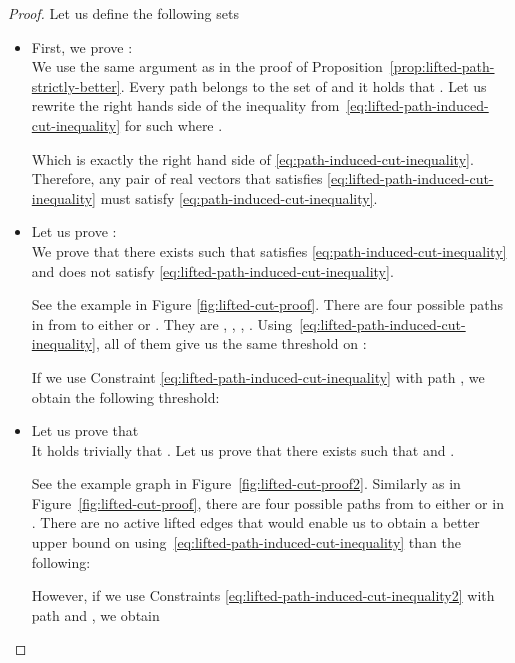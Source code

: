 \documentclass{article}
\begin{document}
\begin{proof}
Let us define the following sets




\begin{itemize}
\item First, we prove :\\
We use the same argument as in the proof of Proposition~\ref{prop:lifted-path-strictly-better}. Every path  belongs to the set of  and it holds that . 
Let us rewrite the right hands side of the inequality from~\eqref{eq:lifted-path-induced-cut-inequality} for such   where . 

Which is exactly the right hand side of \eqref{eq:path-induced-cut-inequality}. Therefore, any pair of real vectors  that satisfies \eqref{eq:lifted-path-induced-cut-inequality} must satisfy \eqref{eq:path-induced-cut-inequality}.\\


\item Let us prove :\\
We prove that there exists  such that  satisfies \eqref{eq:path-induced-cut-inequality} and does not satisfy \eqref{eq:lifted-path-induced-cut-inequality}.

See the example in Figure \ref{fig:lifted-cut-proof}. There are four possible paths in  from  to either  or . They are , , , . Using~\eqref{eq:lifted-path-induced-cut-inequality}, all of them give us the same threshold on :

If we use Constraint \eqref{eq:lifted-path-induced-cut-inequality} with path , we obtain the following threshold:



\item Let us prove that \\
It holds trivially that . Let us prove that there exists   such that  and .

See the example graph in Figure~\ref{fig:lifted-cut-proof2}. Similarly as in Figure~\ref{fig:lifted-cut-proof}, there are  four possible paths from  to either  or  in . There are no active lifted edges that would enable us to obtain a better upper bound on  using~\eqref{eq:lifted-path-induced-cut-inequality} than the following:

However, if we use Constraints \eqref{eq:lifted-path-induced-cut-inequality2} with path  and , we obtain

\end{itemize}
\end{proof}
\end{document}
